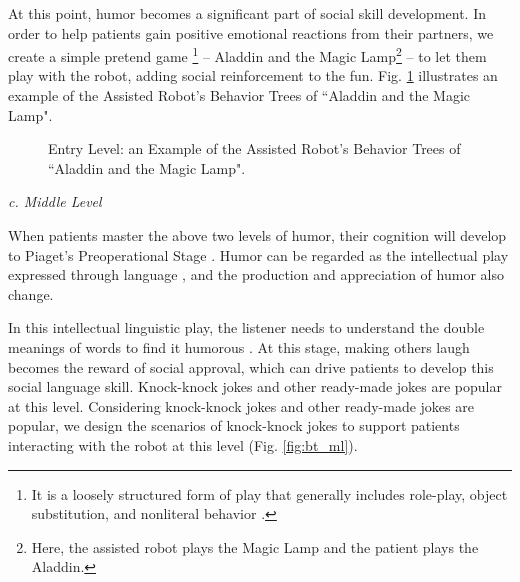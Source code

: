 \documentclass[letterpaper]{article} %
\begin{document}
At this point, humor becomes a significant part of social skill development. In order to help patients gain positive emotional reactions from their partners, we create a simple pretend game \footnote{It is a loosely structured form of play that generally includes role-play, object substitution, and nonliteral behavior \cite{fein1981pretend}.} -- Aladdin and the Magic Lamp\footnote{Here, the assisted robot plays the Magic Lamp and the patient plays the Aladdin.} -- to let them play with the robot, adding social reinforcement to the fun. Fig. \ref{fig:bt_bl} illustrates an example of the Assisted Robot's Behavior Trees of ``Aladdin and the Magic Lamp".

\begin{figure}
\centering
{}
 \caption{Entry Level: an Example of the Assisted Robot's Behavior Trees of ``Aladdin and the Magic Lamp".}
 \label{fig:bt_bl}
 \end{figure}


\textit{c. Middle Level}

When patients master the above two levels of humor, their cognition will develop to Piaget’s Preoperational Stage \cite{papalia2007human}. Humor can be regarded as the intellectual play expressed through language \cite{freud1960jokes}, and the production and appreciation of humor also change. 

In this intellectual linguistic play, the listener needs to understand the double meanings of words to find it humorous \cite{southam2005humor}. At this stage, making others laugh becomes the reward of social approval, which can drive patients to develop this social language skill. Knock-knock jokes and other ready-made jokes are popular at this level. Considering knock-knock jokes and other ready-made jokes are popular, we design the scenarios of knock-knock jokes to support patients interacting with the robot at this level (Fig. \ref{fig:bt_ml}).
\end{document}

